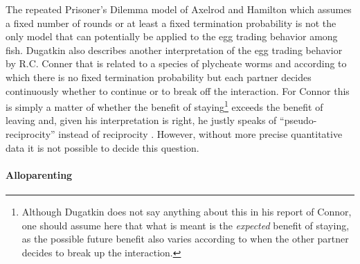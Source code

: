 The repeated Prisoner's Dilemma model of Axelrod and Hamilton
\cite[]{axelrod:1984} which assumes a fixed number of rounds or at least a
fixed termination probability is not the only model that can potentially be
applied to the egg trading behavior among fish. Dugatkin also describes
another interpretation of the egg trading behavior by R.C. Conner that is
related to a species of plycheate worms and according to which there is no
fixed termination probability but each partner decides continuously whether to
continue or to break off the interaction. For Connor this is simply a matter
of whether the benefit of staying\footnote{Although Dugatkin does not say
  anything about this in his report of Connor, one should assume here that
  what is meant is the {\em expected} benefit of staying, as the possible
  future benefit also varies according to when the other partner decides to
  break up the interaction.} exceeds the benefit of leaving and, given his
interpretation is right, he justly speaks of ``pseudo-reciprocity'' instead of
reciprocity \cite[p.\ 49]{dugatkin:1997}. However, without more precise
quantitative data it is not possible to decide this question.

\paragraph{Alloparenting}

